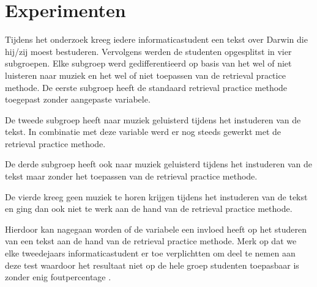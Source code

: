 \documentclass{hogent-article}
\begin{document}
	
	\section{Experimenten} %
	Tijdens het onderzoek kreeg iedere informaticastudent een tekst over Darwin die hij/zij moest bestuderen. Vervolgens werden de studenten opgesplitst in vier subgroepen. Elke subgroep werd gedifferentieerd op basis van het wel of niet luisteren naar muziek en het wel of niet toepassen van de retrieval practice methode.
	De eerste subgroep heeft de standaard retrieval practice methode toegepast zonder aangepaste variabele. 

	De tweede subgroep heeft naar muziek geluisterd tijdens het instuderen van de tekst. In combinatie met deze variable werd er nog steeds gewerkt met de retrieval practice methode.
	
	De derde subgroep heeft ook naar muziek geluisterd tijdens het instuderen van de tekst maar zonder het toepassen van de retrieval practice methode.
	
	De vierde kreeg geen muziek te horen krijgen tijdens het instuderen van de tekst en ging dan ook niet te werk aan de hand van de retrieval practice methode.
	
	Hierdoor kan nagegaan worden of de variabele een invloed heeft op het studeren van een tekst aan de hand van de retrieval practice methode. Merk op dat we elke tweedejaars informaticastudent er toe verplichtten om deel te nemen aan deze test waardoor het resultaat niet op de hele groep studenten toepasbaar is zonder enig foutpercentage \autocite{karpicke2009metacognitive}.
	
\end{document}
